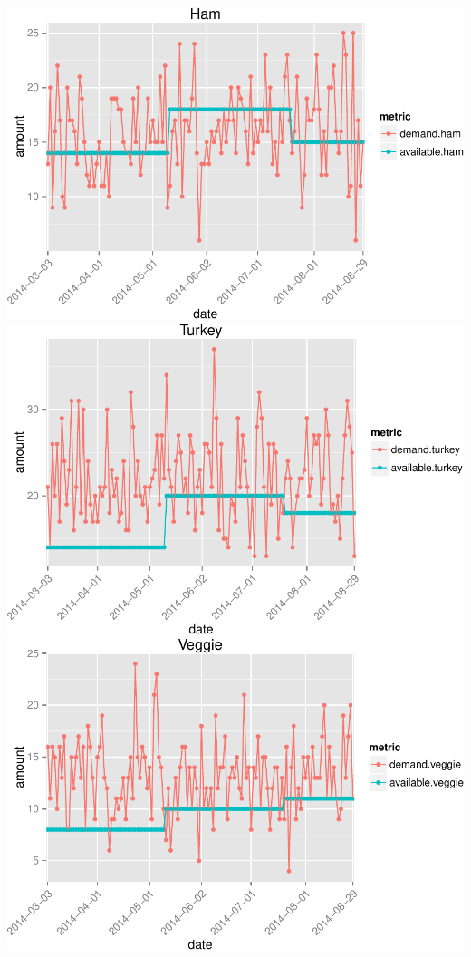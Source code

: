 \documentclass[]{article}
\begin{document}
\includegraphics{./IS606_Sandwich_files/figure-latex/unnamed-chunk-11.pdf}
\includegraphics{./IS606_Sandwich_files/figure-latex/unnamed-chunk-12.pdf}
\includegraphics{./IS606_Sandwich_files/figure-latex/unnamed-chunk-13.pdf}
\end{document}
